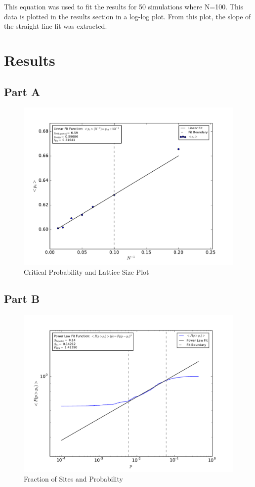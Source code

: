 \documentclass[12pt]{article}
\begin{document}
\indent This equation was used to fit the results for 50 simulations where N=100. This data is plotted in the results section in a log-log plot. From this plot, the slope of the straight line fit was extracted.

\section{Results}

\subsection{Part A}

\begin{figure}[!h]
	\includegraphics[width=1\textwidth]{../output/plots_for_paper/pc_ave_vs_InverseN.pdf}
		\caption{Critical Probability and Lattice Size Plot}
		\label{fig:1}
\end{figure}

\clearpage
\subsection{Part B}

\begin{figure}[!h]
	\includegraphics[width=1\textwidth]{../output/plots_for_paper/F_ave_vs_p.pdf}
	\caption{Fraction of Sites and Probability}
	\label{fig:2}
\end{figure}
\end{document}
